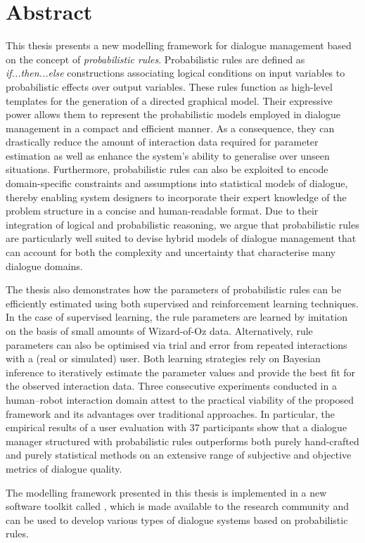 \chapter*{Abstract}

This thesis presents a new modelling framework for dialogue management based on the concept of \textit{probabilistic rules}.  Probabilistic rules are defined as \textit{if...then...else} constructions associating logical conditions on input variables to probabilistic effects over output variables.  These rules function as high-level templates for the generation of a directed graphical model. Their expressive power allows them to represent the probabilistic models employed in dialogue management in a compact and efficient manner. As a consequence, they can drastically reduce the amount of interaction data required for parameter estimation as well as enhance the system's ability to generalise over unseen situations. Furthermore, probabilistic rules can also be exploited to encode domain-specific constraints and assumptions into statistical models of dialogue, thereby enabling system designers to incorporate their expert knowledge of the problem structure in a concise and human-readable format.  Due to their integration of logical and probabilistic reasoning, we argue that probabilistic rules are particularly well suited to devise hybrid models of dialogue management that can account for both the complexity and uncertainty that characterise many dialogue domains.

The thesis also demonstrates how the parameters of probabilistic rules can be efficiently estimated using both supervised and reinforcement learning techniques. In the case of supervised learning, the rule parameters are learned by imitation on the basis of small amounts of Wizard-of-Oz data.  Alternatively, rule parameters can also be optimised via trial and error from repeated interactions with a (real or simulated) user. Both learning strategies rely on Bayesian inference to iteratively estimate the parameter values and provide the best fit for the observed interaction data. Three consecutive experiments conducted in a human--robot interaction domain attest to the practical viability of the proposed framework and its advantages over traditional approaches.  In particular, the empirical results of a user evaluation with 37 participants show that a dialogue manager structured with probabilistic rules outperforms both purely hand-crafted and purely statistical methods on an extensive range of subjective and objective metrics of dialogue quality.

The modelling framework presented in this thesis is implemented in a new software toolkit called \opendial{}, which is made available to the research community and can be used to develop various types of dialogue systems based on probabilistic rules. 
